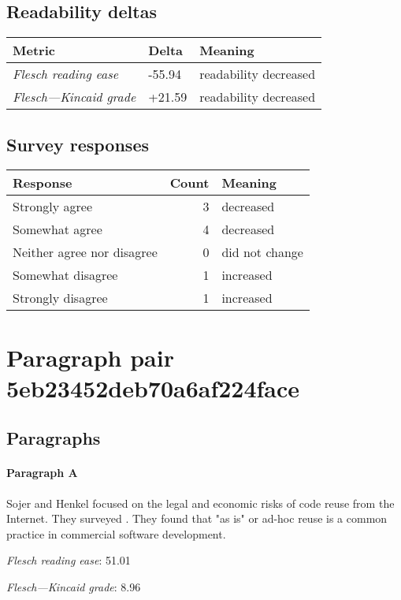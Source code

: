 \subsection{Readability deltas}

\begin{tabular}{lll}
\toprule
               \textbf{Metric} & \textbf{Delta} &       \textbf{Meaning} \\
\midrule
    \emph{Flesch reading ease} &         -55.94 &  readability decreased \\
 \emph{Flesch---Kincaid grade} &         +21.59 &  readability decreased \\
\bottomrule
\end{tabular}

\subsection{Survey responses}
\begin{tabular}{lrl}
\toprule
          \textbf{Response} &  \textbf{Count} & \textbf{Meaning} \\
\midrule
             Strongly agree &               3 &        decreased \\
             Somewhat agree &               4 &        decreased \\
 Neither agree nor disagree &               0 &   did not change \\
          Somewhat disagree &               1 &        increased \\
          Strongly disagree &               1 &        increased \\
\bottomrule
\end{tabular}

\section{Paragraph pair 5eb23452deb70a6af224face}
\subsection{Paragraphs}
\paragraph{Paragraph A}
Sojer and Henkel focused on the legal and economic risks of code reuse from the Internet. They surveyed . They found that "as is" or ad-hoc reuse is a common practice in commercial software development.\par\medskip
\emph{Flesch reading ease}: 51.01\par
\emph{Flesch---Kincaid grade}: 8.96

